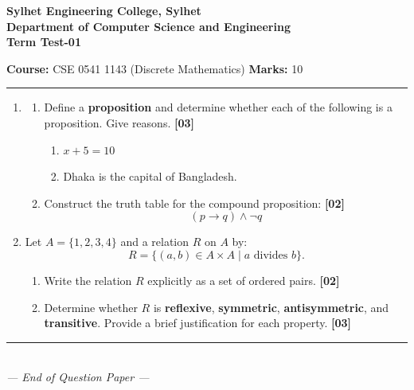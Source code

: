 \documentclass[11pt,a4paper]{article}
\begin{document}
\begin{center}
    {\large\bfseries Sylhet Engineering College, Sylhet}\\[3pt]
    {\normalsize\bfseries Department of Computer Science and Engineering}\\[3pt]
    {\normalsize\bfseries Term Test-01}\\[6pt]
\end{center}

\vspace{2pt}
\noindent
\textbf{Course:} CSE 0541 1143 (Discrete Mathematics) \hfill \textbf{Marks:} 10\\
\rule{\linewidth}{0.8pt}

\vspace{10pt}

\begin{enumerate}[label=\textbf{\arabic*.}, leftmargin=1.5em, itemsep=18pt]

    \item 
    \begin{enumerate}[label=\textbf{(\alph*)}, leftmargin=1.8em, itemsep=10pt]
        \item Define a \textbf{proposition} and determine whether each of the following is a proposition. Give reasons. \hfill \textbf{[03]}
        \begin{enumerate}[label=\roman*), leftmargin=2em, itemsep=4pt]
            \item $x + 5 = 10$
            \item Dhaka is the capital of Bangladesh.
        \end{enumerate}

        \item Construct the truth table for the compound proposition: \hfill \textbf{[02]}
        \[
        (p \to q) \wedge \neg q
        \]
    \end{enumerate}

    \item Let $A = \{1, 2, 3, 4\}$ and a relation $R$ on $A$ by:
    \[
    R = \{(a, b) \in A \times A \mid a \text{ divides } b\}.
    \]
    \begin{enumerate}[label=\textbf{(\alph*)}, leftmargin=1.8em, itemsep=10pt]
        \item Write the relation $R$ explicitly as a set of ordered pairs. \hfill \textbf{[02]}

        \item Determine whether $R$ is \textbf{reflexive}, \textbf{symmetric}, \textbf{antisymmetric}, and \textbf{transitive}. Provide a brief justification for each property. \hfill \textbf{[03]}
    \end{enumerate}

\end{enumerate}

\vfill
\begin{center}
    \rule{0.3\linewidth}{0.4pt}\\[2pt]
    {\footnotesize\itshape --- End of Question Paper ---}
\end{center}
\end{document}
